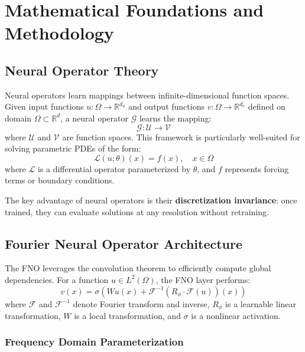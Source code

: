 \documentclass[11pt,twocolumn]{article}
\newcommand{\R}{\mathbb{R}}
\newcommand{\F}{\mathcal{F}}
\newcommand{\G}{\mathcal{G}}
\newcommand{\U}{\mathcal{U}}
\newcommand{\V}{\mathcal{V}}
\begin{document}
\section{Mathematical Foundations and Methodology}

\subsection{Neural Operator Theory}

Neural operators learn mappings between infinite-dimensional function spaces. Given input functions $u: \Omega \rightarrow \R^{d_u}$ and output functions $v: \Omega \rightarrow \R^{d_v}$ defined on domain $\Omega \subset \R^d$, a neural operator $\G$ learns the mapping:
\begin{equation}
\G: \U \rightarrow \V
\end{equation}
where $\U$ and $\V$ are function spaces. This framework is particularly well-suited for solving parametric PDEs of the form:
\begin{equation}
\mathcal{L}(u; \theta)(x) = f(x), \quad x \in \Omega
\end{equation}
where $\mathcal{L}$ is a differential operator parameterized by $\theta$, and $f$ represents forcing terms or boundary conditions.

The key advantage of neural operators is their \textbf{discretization invariance}: once trained, they can evaluate solutions at any resolution without retraining.

\subsection{Fourier Neural Operator Architecture}

The FNO leverages the convolution theorem to efficiently compute global dependencies. For a function $u \in L^2(\Omega)$, the FNO layer performs:
\begin{equation}
v(x) = \sigma \left( W u(x) + \F^{-1}\left( R_\phi \cdot \F(u) \right)(x) \right)
\end{equation}
where $\F$ and $\F^{-1}$ denote Fourier transform and inverse, $R_\phi$ is a learnable linear transformation, $W$ is a local transformation, and $\sigma$ is a nonlinear activation.

\subsubsection{Frequency Domain Parameterization}
\end{document}
